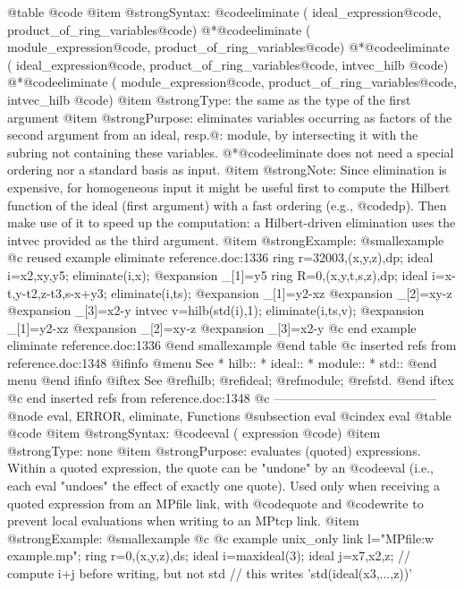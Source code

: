 @table @code
@item @strong{Syntax:}
@code{eliminate (} ideal_expression@code{,} product_of_ring_variables@code{)}
@*@code{eliminate (} module_expression@code{,} product_of_ring_variables@code{)}
@*@code{eliminate (} ideal_expression@code{,} product_of_ring_variables@code{,} intvec_hilb @code{)}
@*@code{eliminate (} module_expression@code{,} product_of_ring_variables@code{,} intvec_hilb @code{)}
@item @strong{Type:}
the same as the type of the first argument
@item @strong{Purpose:}
eliminates variables occurring as factors of the second argument from an
ideal, resp.@: module, by intersecting it with the subring not containing
these variables.
@*@code{eliminate} does not need a special ordering nor a standard basis as input.
@item @strong{Note:}
Since elimination is expensive, for homogeneous input it might be useful
first to compute the Hilbert function of the ideal (first
argument) with a fast ordering (e.g., @code{dp}). Then make use of it to speed
up the computation: a Hilbert-driven elimination uses the intvec
provided as the third argument.
@item @strong{Example:}
@smallexample
@c reused example eliminate reference.doc:1336 
  ring r=32003,(x,y,z),dp;
  ideal i=x2,xy,y5;
  eliminate(i,x);
@expansion{} _[1]=y5
  ring R=0,(x,y,t,s,z),dp;
  ideal i=x-t,y-t2,z-t3,s-x+y3;
  eliminate(i,ts);
@expansion{} _[1]=y2-xz
@expansion{} _[2]=xy-z
@expansion{} _[3]=x2-y
  intvec v=hilb(std(i),1);
  eliminate(i,ts,v);
@expansion{} _[1]=y2-xz
@expansion{} _[2]=xy-z
@expansion{} _[3]=x2-y
@c end example eliminate reference.doc:1336
@end smallexample
@end table
@c inserted refs from reference.doc:1348
@ifinfo
@menu
See
* hilb::
* ideal::
* module::
* std::
@end menu
@end ifinfo
@iftex
See
@ref{hilb};
@ref{ideal};
@ref{module};
@ref{std}.
@end iftex
@c end inserted refs from reference.doc:1348
@c ---------------------------------------
@node eval, ERROR, eliminate, Functions
@subsection eval
@cindex eval
@table @code
@item @strong{Syntax:}
@code{eval (} expression @code{)}
@item @strong{Type:}
none
@item @strong{Purpose:}
evaluates (quoted) expressions. Within a quoted expression, the
quote can be "undone" by an @code{eval} (i.e., each eval "undoes" the
effect of exactly one quote). Used only when receiving a quoted expression
from an MPfile link,
with @code{quote} and @code{write} to
prevent local evaluations  when writing to an MPtcp link.
@item @strong{Example:}
@smallexample
@c @c example unix_only
  link l="MPfile:w example.mp";
  ring r=0,(x,y,z),ds;
  ideal i=maxideal(3);
  ideal j=x7,x2,z;
  // compute i+j before writing, but not std
  // this writes 'std(ideal(x3,...,z))'
